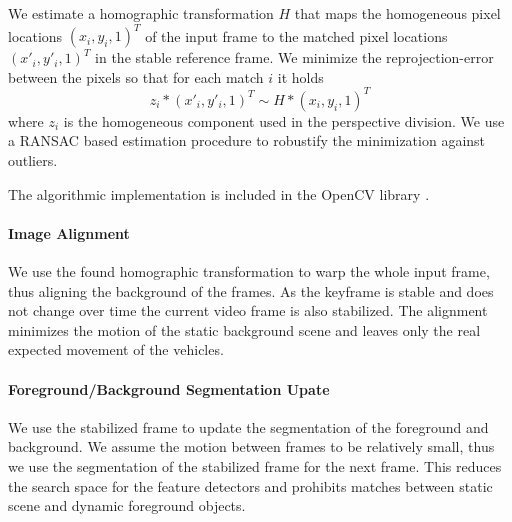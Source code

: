 We estimate a homographic transformation $H$ that maps the homogeneous pixel locations $(x_i, y_i, 1)^T$ of the input frame to the matched pixel locations $(x'_i, y'_i, 1)^T$ in the stable reference frame.
We minimize the reprojection-error between the pixels so that for each match $i$ it holds
\begin{equation}
 z_i  * (x'_i, y'_i, 1)^T \sim H * (x_i, y_i, 1)^T
 \label{eq:dynamic_stabilization_homographic_transformation}
\end{equation}
where $z_i$ is the homogeneous component used in the perspective division. 
We use a RANSAC \cite{fischler1981random} based estimation procedure to robustify the minimization against outliers.

The algorithmic implementation is included in the OpenCV library \cite{opencv_library}.


\paragraph{Image Alignment}
We use the found homographic transformation to warp the whole input frame, thus aligning the background of the frames.
As the keyframe is stable and does not change over time the current video frame is also stabilized.
The alignment minimizes the motion of the static background scene and leaves only the real expected movement of the vehicles.


\paragraph{Foreground/Background Segmentation Upate}
We use the stabilized frame to update the segmentation of the foreground and background.
We assume the motion between frames to be relatively small, thus we use the segmentation of the stabilized frame for the next frame.
This reduces the search space for the feature detectors and prohibits matches between static scene and dynamic foreground objects. 
